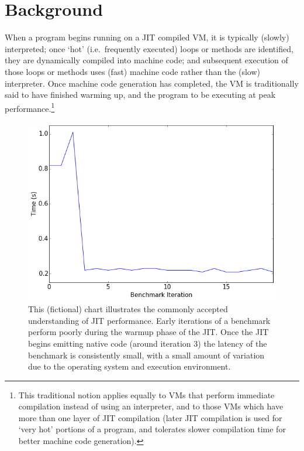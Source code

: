\documentclass[10pt,preprint]{sigplanconf}
\begin{document}
\section{Background}
\label{sec:warmup}


When a program begins running on a JIT compiled VM, it is typically (slowly)
interpreted; once `hot' (i.e.~frequently executed) loops or methods are
identified, they are dynamically compiled into machine code; and subsequent
execution of those loops or methods uses (fast) machine code rather than the
(slow) interpreter. Once machine code generation has completed, the VM is
traditionally said to have finished warming up, and the program to be executing
at peak performance.\footnote{This traditional notion applies equally to VMs
that perform immediate compilation instead of using an interpreter, and to
those VMs which have more than one layer of JIT compilation (later JIT
compilation is used for `very hot' portions of a program, and tolerates slower
compilation time for better machine code generation).}

\begin{figure}[h!]
\centering
\includegraphics[width=.4\textwidth]{img/trad}
\caption{ This (fictional) chart illustrates the commonly accepted understanding
of JIT performance. Early iterations of a benchmark perform poorly during the
warmup phase of the JIT. Once the JIT begins emitting native code (around
iteration 3) the latency of the benchmark is consistently small, with a small
amount of variation due to the operating system and execution environment.}
\label{fig:trad}
\end{figure}
\end{document}
